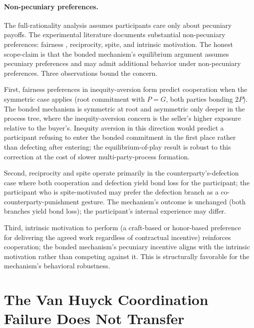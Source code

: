 \documentclass[11pt,a4paper]{article}
\theoremstyle{definition}
\theoremstyle{remark}
\newcommand{\pay}{P}
\newcommand{\cumval}{G}
\begin{document}
\paragraph{Non-pecuniary preferences.}
The full-rationality analysis assumes participants care only
about pecuniary payoffs. The experimental literature documents
substantial non-pecuniary preferences: fairness
\citep{fehr_schmidt_1999, bolton_ockenfels_2000}, reciprocity,
spite, and intrinsic motivation. The honest scope-claim is that
the bonded mechanism's equilibrium argument assumes pecuniary
preferences and may admit additional behavior under
non-pecuniary preferences. Three observations bound the concern.

First, fairness preferences in inequity-aversion form
\citep{fehr_schmidt_1999} predict cooperation when the symmetric
case applies (root commitment with $\pay = \cumval$, both parties
bonding $2\pay$). The bonded mechanism is symmetric at root and
asymmetric only deeper in the process tree, where the
inequity-aversion concern is the seller's higher exposure relative
to the buyer's. Inequity aversion in this direction would predict
a participant refusing to enter the bonded commitment in the first
place rather than defecting after entering; the equilibrium-of-play
result is robust to this correction at the cost of slower
multi-party-process formation.

Second, reciprocity and spite operate primarily in the
counterparty's-defection case where both cooperation and defection
yield bond loss for the participant; the participant who is
spite-motivated may prefer the defection branch as a
co-counterparty-punishment gesture. The mechanism's outcome is
unchanged (both branches yield bond loss); the participant's
internal experience may differ.

Third, intrinsic motivation to perform (a craft-based or honor-based
preference for delivering the agreed work regardless of contractual
incentive) reinforces cooperation; the bonded mechanism's pecuniary
incentive aligns with the intrinsic motivation rather than competing
against it. This is structurally favorable for the mechanism's
behavioral robustness.

\section{The Van Huyck Coordination Failure Does Not Transfer}
\label{sec:vanhuyck}
\end{document}
